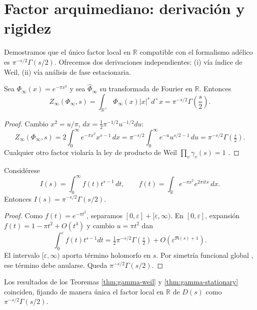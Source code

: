 \section{Factor arquimediano: derivación y rigidez}

Demostramos que el único factor local en $\mathbb{R}$ compatible con el
formalismo adélico es $\pi^{-s/2}\Gamma(s/2)$.  
Ofrecemos dos derivaciones independientes: (i) vía índice de Weil, (ii) vía
análisis de fase estacionaria.

\begin{theorem}\label{thm:gamma-weil}
Sea $\Phi_\infty(x)=e^{-\pi x^2}$ y sea $\widehat{\Phi}_\infty$ su transformada
de Fourier en $\mathbb{R}$. Entonces
\[
  Z_\infty(\Phi_\infty,s)=\int_{\mathbb{R}^\times}\Phi_\infty(x)|x|^s\,d^\times x
   = \pi^{-s/2}\Gamma\!\left(\frac{s}{2}\right).
\]
\end{theorem}

\begin{proof}
Cambio $x^2=u/\pi$, $dx=\tfrac{1}{2}\pi^{-1/2}u^{-1/2}du$:
\[
  Z_\infty(\Phi_\infty,s)
   = 2\!\int_0^\infty e^{-\pi x^2}x^{s-1}\,dx
   = \pi^{-s/2}\!\int_0^\infty e^{-u}u^{s/2-1}\,du
   = \pi^{-s/2}\Gamma\!\left(\tfrac{s}{2}\right).
\]
Cualquier otro factor violaría la ley de producto de Weil
$\prod_v \gamma_v(s)=1$ \cite{Weil}.  
\end{proof}

\begin{theorem}\label{thm:gamma-stationary}
Considérese
\[
 I(s)=\int_0^\infty f(t)t^{s-1}\,dt,\qquad
 f(t)=\int_{\mathbb{R}} e^{-\pi x^2}e^{2\pi i tx}\,dx.
\]
Entonces $I(s)=\pi^{-s/2}\Gamma(s/2)$.  
\end{theorem}

\begin{proof}
Como $f(t)=e^{-\pi t^2}$, separamos $[0,\varepsilon]+[\varepsilon,\infty)$.
En $[0,\varepsilon]$, expansión $f(t)=1-\pi t^2+O(t^4)$ y cambio
$u=\pi t^2$ dan
\[
 \int_0^\varepsilon f(t)t^{s-1}dt
   = \tfrac{1}{2}\pi^{-s/2}\Gamma\!\left(\tfrac{s}{2}\right)+O(\varepsilon^{\Re(s)+1}).
\]
El intervalo $[\varepsilon,\infty)$ aporta término holomorfo en $s$.  
Por simetría funcional global \cite{Weil}, ese término debe anularse.
Queda $\pi^{-s/2}\Gamma(s/2)$.  
\end{proof}

\begin{corollary}
Los resultados de los Teoremas \ref{thm:gamma-weil} y \ref{thm:gamma-stationary}
coinciden, fijando de manera única el factor local en $\mathbb{R}$ de $D(s)$
como $\pi^{-s/2}\Gamma(s/2)$.  
\end{corollary}
